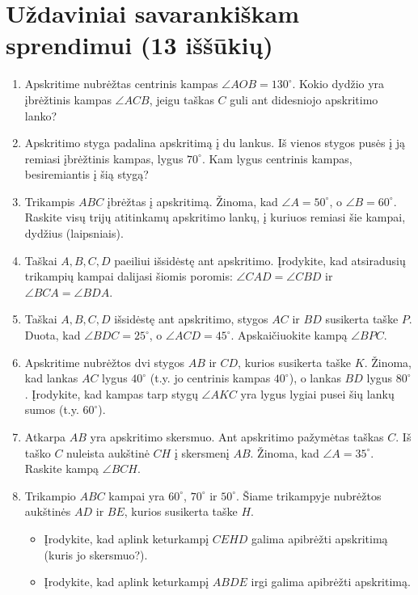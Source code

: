 \documentclass[11pt,a4paper]{scrartcl}
\begin{document}
\section{Uždaviniai savarankiškam sprendimui (13 iššūkių)}
\begin{enumerate}
    \renewcommand{\labelenumi}{\textbf{\theenumi.}}
    
    \item Apskritime nubrėžtas centrinis kampas $\angle AOB = 130^\circ$. Kokio dydžio yra įbrėžtinis kampas $\angle ACB$, jeigu taškas $C$ guli ant didesniojo apskritimo lanko?
    \item Apskritimo styga padalina apskritimą į du lankus. Iš vienos stygos pusės į ją remiasi įbrėžtinis kampas, lygus $70^\circ$. Kam lygus centrinis kampas, besiremiantis į šią stygą?
    \item Trikampis $ABC$ įbrėžtas į apskritimą. Žinoma, kad $\angle A = 50^\circ$, o $\angle B = 60^\circ$. Raskite visų trijų atitinkamų apskritimo lankų, į kuriuos remiasi šie kampai, dydžius (laipsniais).
    \item Taškai $A, B, C, D$ paeiliui išsidėstę ant apskritimo. Įrodykite, kad atsiradusių trikampių kampai dalijasi šiomis poromis: $\angle CAD = \angle CBD$ ir $\angle BCA = \angle BDA$.
    \item Taškai $A, B, C, D$ išsidėstę ant apskritimo, stygos $AC$ ir $BD$ susikerta taške $P$. Duota, kad $\angle BDC = 25^\circ$, o $\angle ACD = 45^\circ$. Apskaičiuokite kampą $\angle BPC$.
    \item Apskritime nubrėžtos dvi stygos $AB$ ir $CD$, kurios susikerta taške $K$. Žinoma, kad lankas $AC$ lygus $40^\circ$ (t.y. jo centrinis kampas $40^\circ$), o lankas $BD$ lygus $80^\circ$. Įrodykite, kad kampas tarp stygų $\angle AKC$ yra lygus lygiai pusei šių lankų sumos (t.y. $60^\circ$).
    \item Atkarpa $AB$ yra apskritimo skersmuo. Ant apskritimo pažymėtas taškas $C$. Iš taško $C$ nuleista aukštinė $CH$ į skersmenį $AB$. Žinoma, kad $\angle A = 35^\circ$. Raskite kampą $\angle BCH$.
    \item Trikampio $ABC$ kampai yra $60^\circ$, $70^\circ$ ir $50^\circ$. Šiame trikampyje nubrėžtos aukštinės $AD$ ir $BE$, kurios susikerta taške $H$. 
    \begin{itemize}
        \item[a)] Įrodykite, kad aplink keturkampį $CEHD$ galima apibrėžti apskritimą (kuris jo skersmuo?).
        \item[b)] Įrodykite, kad aplink keturkampį $ABDE$ irgi galima apibrėžti apskritimą.

\end{itemize}
\end{enumerate}
\end{document}
